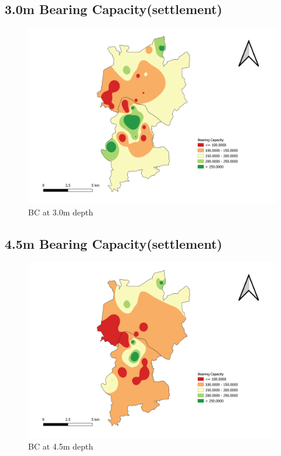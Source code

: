 \begin{landscape}
\section{3.0m Bearing Capacity(settlement)}
\begin{figure}[!hbt]
\centering
\includegraphics[width=0.8\linewidth, height=0.8\textheight,keepaspectratio]{in/map/Deflection_3_0.png}
\caption{BC at 3.0m depth}
\end{figure}
\pagebreak
\end{landscape}

\begin{landscape}
\section{4.5m Bearing Capacity(settlement)}
\begin{figure}[!hbt]
\centering
\includegraphics[width=0.8\linewidth, height=0.8\textheight,keepaspectratio]{in/map/Deflection_4_5.png}
\caption{BC at 4.5m depth}
\end{figure}
\pagebreak
\end{landscape}

